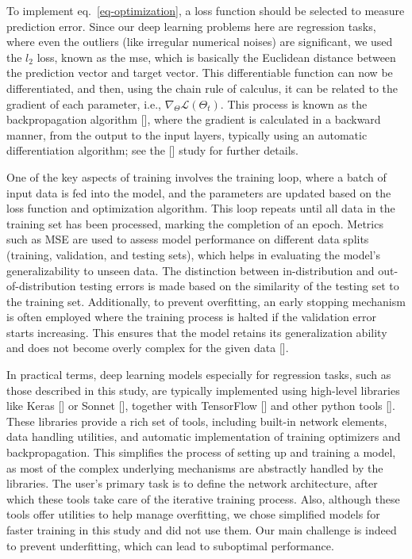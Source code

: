 \documentclass[12pt,a4paper]{report}
\begin{document}
To implement eq.~\ref{eq-optimization}, a loss function should be selected to measure prediction error. Since our deep learning problems here are regression tasks, where even the outliers (like irregular numerical noises) are significant, we used the \(l_2\) loss, known as the \ac{mse}, which is basically the Euclidean distance between the prediction vector and target vector. This differentiable function can now be differentiated, and then, using the chain rule of calculus, it can be related to the gradient of each parameter, i.e., \(\nabla_{\Theta} \mathcal{L}(\Theta_t)\). This process is known as the backpropagation algorithm [\cite{rumelhart1986}], where the gradient is calculated in a backward manner, from the output to the input layers, typically using an automatic differentiation algorithm; see the [\cite{baydin2018}] study for further details.

One of the key aspects of training involves the training loop, where a batch of input data is fed into the model, and the parameters are updated based on the loss function and optimization algorithm. This loop repeats until all data in the training set has been processed, marking the completion of an epoch. Metrics such as MSE are used to assess model performance on different data splits (training, validation, and testing sets), which helps in evaluating the model's generalizability to unseen data. The distinction between in-distribution and out-of-distribution testing errors is made based on the similarity of the testing set to the training set. Additionally, to prevent overfitting, an early stopping mechanism is often employed where the training process is halted if the validation error starts increasing. This ensures that the model retains its generalization ability and does not become overly complex for the given data [\cite{mlbook}].

In practical terms, deep learning models especially for regression tasks, such as those described in this study, are typically implemented using high-level libraries like Keras [\cite{chollet2015}] or Sonnet [\cite{reynolds2017}], together with TensorFlow [\cite{abadi2015}] and other python tools [\cite{hunter2007,pedregosa2011,kluyver2016,harris2020,virtanen2020}]. These libraries provide a rich set of tools, including built-in network elements, data handling utilities, and automatic implementation of training optimizers and backpropagation. This simplifies the process of setting up and training a model, as most of the complex underlying mechanisms are abstractly handled by the libraries. The user's primary task is to define the network architecture, after which these tools take care of the iterative training process. Also, although these tools offer utilities to help manage overfitting, we chose simplified models for faster training in this study and did not use them. Our main challenge is indeed to prevent underfitting, which can lead to suboptimal performance.
\end{document}
